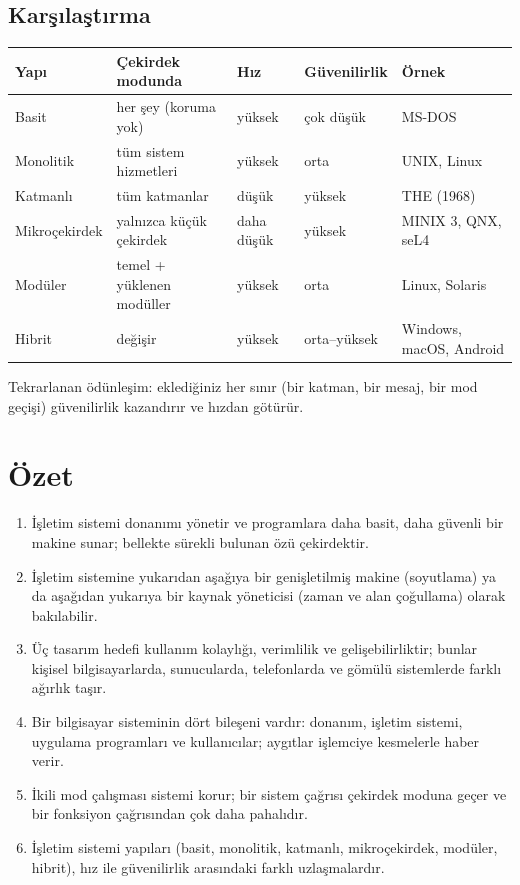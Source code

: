 \documentclass[11pt,a4paper]{article}
\begin{document}
\subsection{Karşılaştırma}

\begin{center}
\renewcommand{\arraystretch}{1.3}
\begin{tabular}{@{}lllll@{}}
\toprule
\textbf{Yapı} & \textbf{Çekirdek modunda} & \textbf{Hız} & \textbf{Güvenilirlik} & \textbf{Örnek} \\
\midrule
Basit & her şey (koruma yok) & yüksek & çok düşük & MS-DOS \\
Monolitik & tüm sistem hizmetleri & yüksek & orta & UNIX, Linux \\
Katmanlı & tüm katmanlar & düşük & yüksek & THE (1968) \\
Mikroçekirdek & yalnızca küçük çekirdek & daha düşük & yüksek & MINIX 3, QNX, seL4 \\
Modüler & temel + yüklenen modüller & yüksek & orta & Linux, Solaris \\
Hibrit & değişir & yüksek & orta--yüksek & Windows, macOS, Android \\
\bottomrule
\end{tabular}
\end{center}

Tekrarlanan ödünleşim: eklediğiniz her sınır (bir katman, bir mesaj, bir mod geçişi) güvenilirlik kazandırır ve hızdan götürür.

\section{Özet}

\begin{keyidea}
\begin{enumerate}[leftmargin=1.4em]
  \item İşletim sistemi donanımı yönetir ve programlara daha basit, daha güvenli bir makine sunar; bellekte sürekli bulunan özü çekirdektir.
  \item İşletim sistemine yukarıdan aşağıya bir genişletilmiş makine (soyutlama) ya da aşağıdan yukarıya bir kaynak yöneticisi (zaman ve alan çoğullama) olarak bakılabilir.
  \item Üç tasarım hedefi kullanım kolaylığı, verimlilik ve gelişebilirliktir; bunlar kişisel bilgisayarlarda, sunucularda, telefonlarda ve gömülü sistemlerde farklı ağırlık taşır.
  \item Bir bilgisayar sisteminin dört bileşeni vardır: donanım, işletim sistemi, uygulama programları ve kullanıcılar; aygıtlar işlemciye kesmelerle haber verir.
  \item İkili mod çalışması sistemi korur; bir sistem çağrısı çekirdek moduna geçer ve bir fonksiyon çağrısından çok daha pahalıdır.
  \item İşletim sistemi yapıları (basit, monolitik, katmanlı, mikroçekirdek, modüler, hibrit), hız ile güvenilirlik arasındaki farklı uzlaşmalardır.
\end{enumerate}
\end{keyidea}
\end{document}
